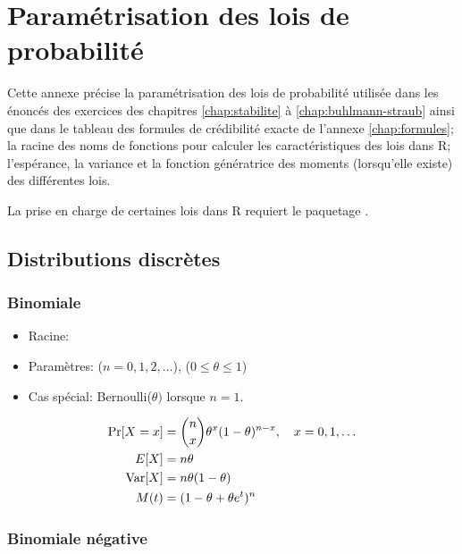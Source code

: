 \chapter{Paramétrisation des lois de probabilité}
\label{chap:distributions}

\begingroup
{}

Cette annexe précise la paramétrisation des lois de probabilité
utilisée dans les énoncés des exercices des chapitres
\ref{chap:stabilite} à \ref{chap:buhlmann-straub} ainsi que dans le
tableau des formules de crédibilité exacte de l'annexe
\ref{chap:formules}; la racine des noms de fonctions pour calculer les
caractéristiques des lois dans R; l'espérance, la variance et la
fonction génératrice des moments (lorsqu'elle existe) des différentes
lois.

La prise en charge de certaines lois dans R requiert le paquetage
 \citep{actuar}.


\section{Distributions discrètes}

\subsection{Binomiale}
\label{distributions:binomiale}

\begin{itemize}
\item Racine: 
\item Paramètres:  ($n = 0, 1, 2, \dots$),
   ($0 \leq \theta \leq 1$)
\end{itemize}
\begin{itemize}
\item Cas spécial: Bernoulli($\theta)$ lorsque $n = 1$.
\end{itemize}
\begin{align*}
  \Pr[X = x]
  &= \binom{n}{x} \theta^x (1 - \theta)^{n - x}, \quad
  x = 0, 1, \dots \\
  E [ X ]
  &= n \theta \\
  \operatorname{Var} [ X ]
  &= n \theta (1 - \theta) \\
  M(t)
  &= (1 - \theta + \theta e^t)^n
\end{align*}

\subsection{Binomiale négative}
\label{distributions:binomialeneg}

